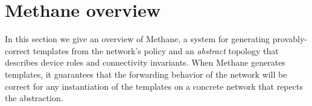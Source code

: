 \documentclass[numbers, 10pt, preprint]{sigplanconf}
\newcommand{\sysname}{{\small \sf Methane}\xspace}
\newcommand{\sysnamesec}{{\sf Methane}\xspace}
\begin{document}
%

%
%
%
%

\section{Methane overview}
\label{sec:overview}

In this section we give an overview of \sysname, a system for generating provably-correct templates from the network's policy and an {\em abstract} topology that describes device roles and connectivity invariants.
%
%
When \sysname generates templates, it guarantees that the forwarding behavior of the network will be correct for any instantiation of the templates on a concrete network that repects the abstraction. 
\end{document}
